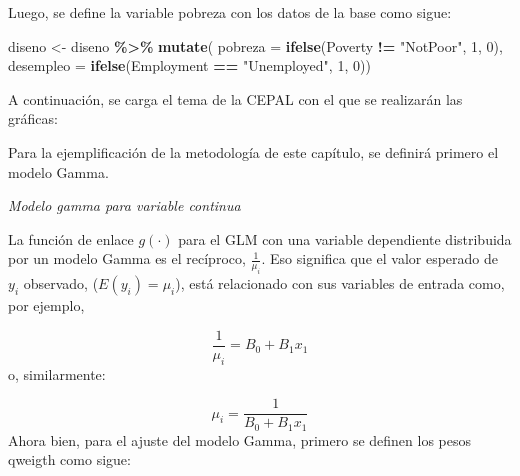 \documentclass[
  12pt,
]{book}
\newenvironment{Shaded}{\begin{snugshade}}{\end{snugshade}}
\newcommand{\AttributeTok}[1]{\textcolor[rgb]{0.13,0.29,0.53}{#1}}
\newcommand{\DecValTok}[1]{\textcolor[rgb]{0.00,0.00,0.81}{#1}}
\newcommand{\FunctionTok}[1]{\textcolor[rgb]{0.13,0.29,0.53}{\textbf{#1}}}
\newcommand{\NormalTok}[1]{#1}
\newcommand{\OtherTok}[1]{\textcolor[rgb]{0.56,0.35,0.01}{#1}}
\newcommand{\SpecialCharTok}[1]{\textcolor[rgb]{0.81,0.36,0.00}{\textbf{#1}}}
\newcommand{\StringTok}[1]{\textcolor[rgb]{0.31,0.60,0.02}{#1}}
\begin{document}
Luego, se define la variable pobreza con los datos de la base como sigue:

\begin{Shaded}
\begin{Highlighting}[]
\NormalTok{diseno }\OtherTok{\textless{}{-}}\NormalTok{ diseno }\SpecialCharTok{\%\textgreater{}\%} 
  \FunctionTok{mutate}\NormalTok{(}
  \AttributeTok{pobreza =} \FunctionTok{ifelse}\NormalTok{(Poverty }\SpecialCharTok{!=} \StringTok{"NotPoor"}\NormalTok{, }\DecValTok{1}\NormalTok{, }\DecValTok{0}\NormalTok{),}
  \AttributeTok{desempleo =} \FunctionTok{ifelse}\NormalTok{(Employment }\SpecialCharTok{==} \StringTok{"Unemployed"}\NormalTok{, }\DecValTok{1}\NormalTok{, }\DecValTok{0}\NormalTok{))}
\end{Highlighting}
\end{Shaded}

A continuación, se carga el tema de la CEPAL con el que se realizarán las gráficas:

Para la ejemplificación de la metodología de este capítulo, se definirá primero el modelo Gamma.

\emph{Modelo gamma para variable continua}

La función de enlace \(g(\cdot)\) para el GLM con una variable dependiente distribuida por un modelo Gamma es el recíproco, \(\frac{1}{\mu_{i}}\). Eso significa que el valor esperado de \(y_i\) observado, (\(E(y_i) = \mu_i\)), está relacionado con sus variables de entrada como, por ejemplo,

\[
\frac{1}{\mu_{i}} = B_0 + B_1x_1
\]
o, similarmente:

\[
\mu_{i} = \frac{1}{B_0 + B_1x_1}
\]
Ahora bien, para el ajuste del modelo Gamma, primero se definen los pesos qweigth como sigue:

\begin{Shaded}
\end{Shaded}
\end{document}
